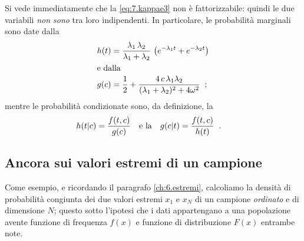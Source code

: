 Si vede immediatamente che la \eqref{eq:7.kappae3} non \`e
fattorizzabile: quindi le due variabili \emph{non sono} tra
loro indipendenti.  In particolare, le probabilit\`a
marginali sono date dalla
\begin{align*}
  h(t) &= \frac{\lambda_1 \, \lambda_2}{\lambda_1 +
    \lambda_2} \, \left( e^{- \lambda_1 t} + e^{- \lambda_2
      t} \right) \\
  \intertext{e dalla}
  g(c) &=  \frac{1}{2} + \frac{4 \, c \, \lambda_1
    \lambda_2}{( \lambda_1 + \lambda_2 )^2 + 4 \omega^2}
  \;\; ;
\end{align*}
mentre le probabilit\`a condizionate sono, da definizione,
la
\begin{align*}
  h(t|c) &= \frac{ f(t, c) }{ g(c) } &&\text{e la} &
  g(c|t) &= \frac{ f(t, c) }{ h(t) } \;\; .
\end{align*}

\subsection{Ancora sui valori estremi di un campione}%
%
\label{ch:7.estremi}
Come esempio, e ricordando il paragrafo \ref{ch:6.estremi},
calcoliamo la densit\`a di probabilit\`a congiunta dei due
valori estremi $x_1$ e $x_N$ di un campione \emph{ordinato}
e di dimensione $N$; questo sotto l'ipotesi che i dati
appartengano a una popolazione avente funzione di frequenza
$f(x)$ e funzione di distribuzione $F(x)$ entrambe note.

